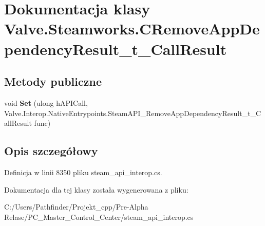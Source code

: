 \hypertarget{class_valve_1_1_steamworks_1_1_c_remove_app_dependency_result__t___call_result}{}\section{Dokumentacja klasy Valve.\+Steamworks.\+C\+Remove\+App\+Dependency\+Result\+\_\+t\+\_\+\+Call\+Result}
\label{class_valve_1_1_steamworks_1_1_c_remove_app_dependency_result__t___call_result}
\subsection*{Metody publiczne}
\begin{DoxyCompactItemize}
\item 
\mbox{\label{class_valve_1_1_steamworks_1_1_c_remove_app_dependency_result__t___call_result_a25680020b4b13ea8ff1c66d7116b4e9f}} 
void {\bfseries Set} (ulong h\+A\+P\+I\+Call, Valve.\+Interop.\+Native\+Entrypoints.\+Steam\+A\+P\+I\+\_\+\+Remove\+App\+Dependency\+Result\+\_\+t\+\_\+\+Call\+Result func)
\end{DoxyCompactItemize}


\subsection{Opis szczegółowy}


Definicja w linii 8350 pliku steam\+\_\+api\+\_\+interop.\+cs.



Dokumentacja dla tej klasy została wygenerowana z pliku\+:\begin{DoxyCompactItemize}
\item 
C\+:/\+Users/\+Pathfinder/\+Projekt\+\_\+cpp/\+Pre-\/\+Alpha Relase/\+P\+C\+\_\+\+Master\+\_\+\+Control\+\_\+\+Center/steam\+\_\+api\+\_\+interop.\+cs\end{DoxyCompactItemize}
